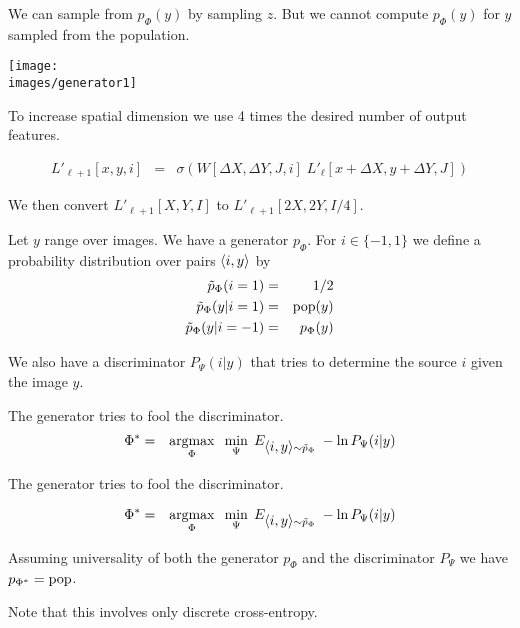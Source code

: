 {\bigskip
We can sample from $p_\Phi(y)$ by sampling $z$.  But we cannot compute $p_\Phi(y)$ for $y$ sampled from the population.


\centerline{\texttt{[image: \\images/generator1]}}

\vfill
To increase spatial dimension we use 4 times the desired number of output features.

\begin{eqnarray*}
  L'_{\ell+1}[x,y,i] & = & \sigma\left(W[\Delta X, \Delta Y, J,i]\; L'_\ell[x + \Delta X, y + \Delta Y, J]\right)
\end{eqnarray*}

\vfill
We then convert $L'_{\ell+1}[X,Y,I]$ to $L'_{\ell+1}[2X,2Y,I/4]$.


Let $y$ range over images.  We have a generator $p_\Phi$. For $i \in \{-1,1\}$ we define a probability distribution over pairs
${\mbox{$\langle i,y\rangle$}}$ by
\begin{eqnarray*}
\tilde{p}_\Phi(i = 1) & = & 1/2 \\
\tilde{p}_\Phi(y|i=1) & =&  \mathrm{pop}(y) \\
\tilde{p}_\Phi(y|i=-1) & = & p_\Phi(y)
\end{eqnarray*}

\vfill
We also have a discriminator $P_\Psi(i|y)$ that tries to determine the source $i$ given the image $y$.

\vfill
The generator tries to fool the discriminator.
\begin{eqnarray*}
\Phi^* & = & \operatorname*{argmax}_\Phi\;\;\min_\Psi\;E_{{\mbox{$\langle i,y\rangle$}} \sim \tilde{p}_\Phi}\;-\ln P_\Psi(i|y)
\end{eqnarray*}


The generator tries to fool the discriminator.

\vfill
\begin{eqnarray*}
\Phi^* & = & \operatorname*{argmax}_\Phi\;\;\min_\Psi\;E_{{\mbox{$\langle i,y\rangle$}} \sim \tilde{p}_\Phi}\;-\ln P_\Psi(i|y)
\end{eqnarray*}

\vfill
Assuming universality of both the generator $p_\Phi$ and the discriminator $P_\Psi$ we have {\color{red} $p_{\Phi^*} = \mathrm{pop}$}.

\vfill
Note that this involves only discrete cross-entropy.

}

